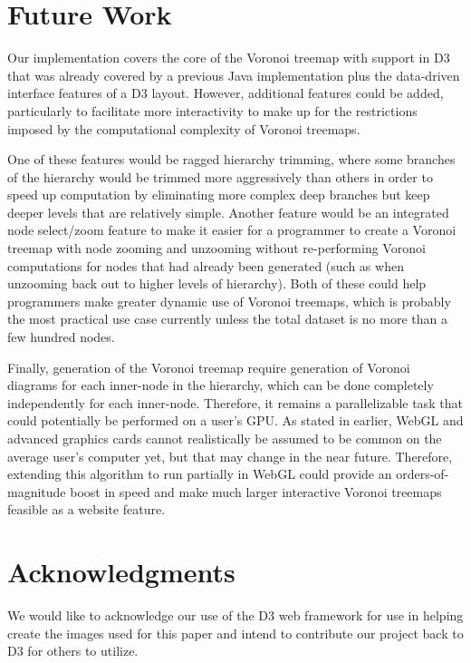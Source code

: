 \documentclass{acm_proc_article-sp} \usepackage{cite}
\begin{document}
\section{Future Work}
\label{sec:future}
Our implementation covers the core of the Voronoi treemap with support
in D3 that was already covered by a previous Java implementation plus
the data-driven interface features of a D3 layout. However, additional
features could be added, particularly to facilitate more interactivity
to make up for the restrictions imposed by the computational
complexity of Voronoi treemaps.

One of these features would be ragged hierarchy trimming, where some
branches of the hierarchy would be trimmed more aggressively than
others in order to speed up computation by eliminating more complex
deep branches but keep deeper levels that are relatively
simple. Another feature would be an integrated node select/zoom
feature to make it easier for a programmer to create a Voronoi treemap
with node zooming and unzooming without re-performing Voronoi
computations for nodes that had already been generated (such as when
unzooming back out to higher levels of hierarchy). Both of these could
help programmers make greater dynamic use of Voronoi treemaps, which
is probably the most practical use case currently unless the total
dataset is no more than a few hundred nodes.

Finally, generation of the Voronoi treemap require generation of
Voronoi diagrams for each inner-node in the hierarchy, which can be done
completely independently for each inner-node. Therefore, it remains a
parallelizable task that could potentially be performed on a user's
GPU. As stated in earlier, WebGL and advanced graphics cards cannot
realistically be assumed to be common on the average user's computer
yet, but that may change in the near future. Therefore, extending this
algorithm to run partially in WebGL could provide an
orders-of-magnitude boost in speed and make much larger interactive
Voronoi treemaps feasible as a website feature.

\section{Acknowledgments}
\label{sec:acknowledgements}
We would like to acknowledge our use of the D3 web framework for use
in helping create the images used for this paper and intend to
contribute our project back to D3 for others to utilize.

{} 
\end{document}
